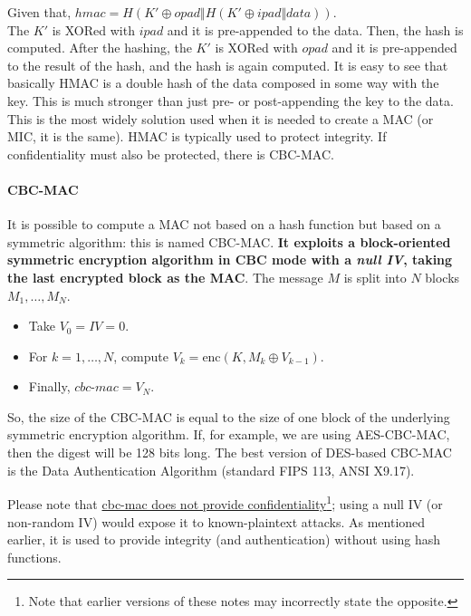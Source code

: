Given that, \(hmac = H(K' \oplus opad \Vert H(K' \oplus ipad \Vert data))\).\\
The \(K'\) is XORed with \(ipad\) and it is pre-appended to the data. Then, the hash is computed. After the hashing, the \(K'\) is XORed with \(opad\) and it is pre-appended to the result of the hash, and the hash is again computed. It is easy to see that basically HMAC is a double hash of the data composed in some way with the key. This is much stronger than just pre- or post-appending the key to the data. This is the most widely solution used when it is needed to create a MAC (or MIC, it is the same). HMAC is typically used to protect integrity. If confidentiality must also be protected, there is CBC-MAC.


\paragraph{CBC-MAC}
It is possible to compute a MAC not based on a hash function but based on a symmetric algorithm: this is named CBC-MAC.
\textbf{It exploits a block-oriented symmetric encryption algorithm in CBC mode with a \emph{null IV}, taking the last encrypted block as the MAC}.
The message \(M\) is split into \(N\) blocks \(M_1, \ldots, M_N\). \begin{itemize}
    \item Take \(V_0  = \mathit{IV} = 0\).
    \item For \(k = 1, \ldots, N\), compute \(V_k = \text{enc}(K, M_k \oplus V_{k-1})\).
    \item Finally, \( \textit{cbc-mac} = V_N\).
\end{itemize}
So, the size of the CBC-MAC is equal to the size of one block of the underlying symmetric encryption algorithm. If, for example, we are using AES-CBC-MAC, then the digest will be 128 bits long. The best version of DES-based CBC-MAC is the Data Authentication Algorithm (standard FIPS 113, ANSI X9.17).

Please note that  \ul{cbc-mac does not provide confidentiality}\footnote{Note that earlier versions of these notes may incorrectly state the opposite.}; using a null IV (or non-random IV) would expose it to known-plaintext attacks. As mentioned earlier, it is used to provide integrity (and authentication) without using hash functions.

